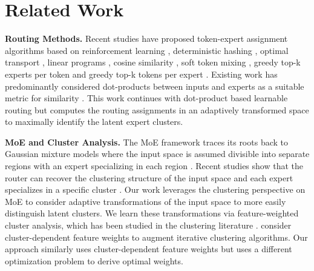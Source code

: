 \section{Related Work}
\label{sec: related work}

\textbf{Routing Methods.} Recent studies have proposed token-expert assignment algorithms based on reinforcement learning \citep{bengio2015conditional}, deterministic hashing \citep{roller2021hash}, optimal transport \citep{liu2022sparsity}, linear programs \citep{lewis2021base}, cosine similarity \citep{chi2022representation}, soft token mixing \citep{puigcerver2023sparse}, greedy top-k experts per token \citep{shazeer2017sparsely} and greedy top-k tokens per expert \citep{zhou2022mixture}. Existing work has predominantly considered dot-products between inputs and experts as a suitable metric for similarity \citep{lewis2021base, puigcerver2023sparse, shazeer2017sparsely, zhou2022mixture, chi2022representation}. This work continues with dot-product based learnable routing but computes the routing assignments in an adaptively transformed space to maximally identify the latent expert clusters.


\textbf{MoE and Cluster Analysis.} The MoE framework traces its roots back to Gaussian mixture models where the input space is assumed divisible into separate regions with an expert specializing in each region \citep{jacobs1991adaptive}. Recent studies show that the router can recover the clustering structure of the input space and each expert specializes in a specific cluster \citep{dikkala2023benefits, chen2022towards}. Our work leverages the clustering perspective on MoE to consider adaptive transformations of the input space to more easily distinguish latent clusters. We learn these transformations via feature-weighted cluster analysis, which has been studied in the clustering literature \citep{brusco2001variable, witten2010framework, gnanadesikan1995weighting, van1989clustering, friedman2004clustering}. \citet{friedman2004clustering} consider cluster-dependent feature weights to augment iterative clustering algorithms. Our approach similarly uses cluster-dependent feature weights but uses a different optimization problem to derive optimal weights. 

